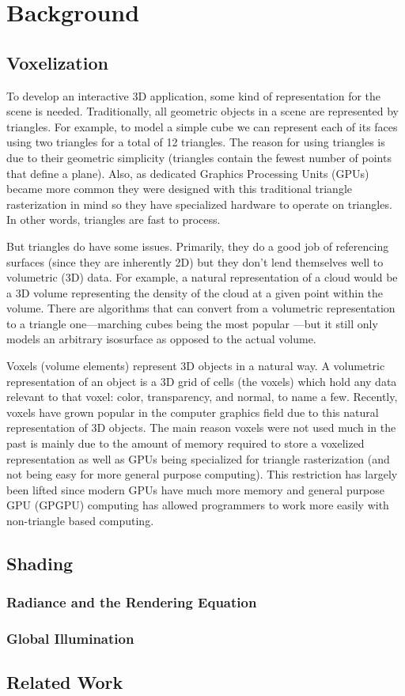 \chapter{Background}

\section{Voxelization}
To develop an interactive 3D application, some kind of representation for the scene is needed. Traditionally, all geometric objects in a scene are represented by triangles. For example, to model a simple cube we can represent each of its faces using two triangles for a total of 12 triangles. The reason for using triangles is due to their geometric simplicity (triangles contain the fewest number of points that define a plane). Also, as dedicated Graphics Processing Units (GPUs) became more common they were designed with this traditional triangle rasterization in mind so they have specialized hardware to operate on triangles. In other words, triangles are fast to process.

But triangles do have some issues. Primarily, they do a good job of referencing surfaces (since they are inherently 2D) but they don't lend themselves well to volumetric (3D) data. For example, a natural representation of a cloud would be a 3D volume representing the density of the cloud at a given point within the volume. There are algorithms that can convert from a volumetric representation to a triangle one---marching cubes being the most popular ---but it still only models an arbitrary isosurface as opposed to the actual volume.

Voxels (volume elements) represent 3D objects in a natural way. A volumetric representation of an object is a 3D grid of cells (the voxels) which hold any data relevant to that voxel: color, transparency, and normal, to name a few. Recently, voxels have grown popular in the computer graphics field due to this natural representation of 3D objects. The main reason voxels were not used much in the past is mainly due to the amount of memory required to store a voxelized representation as well as GPUs being specialized for triangle rasterization (and not being easy for more general purpose computing). This restriction has largely been lifted since modern GPUs have much more memory and general purpose GPU (GPGPU) computing has allowed programmers to work more easily with non-triangle based computing.

\section{Shading}
\subsection{Radiance and the Rendering Equation}
\subsection{Global Illumination}

\section{Related Work}


